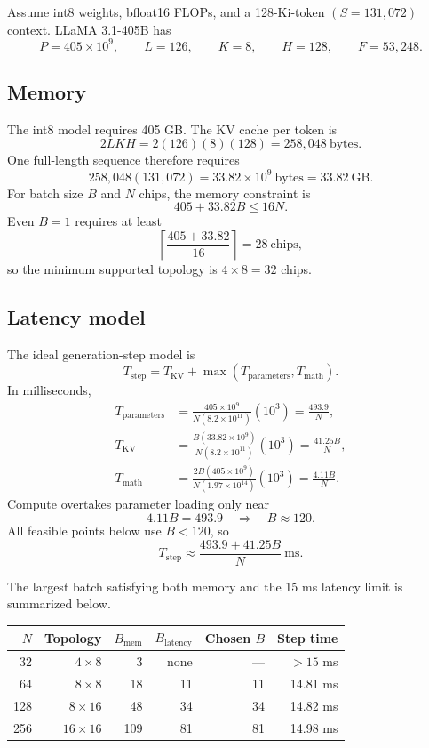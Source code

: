 \documentclass[11pt]{article}
\begin{document}
Assume int8 weights, bfloat16 FLOPs, and a 128-Ki-token
\((S=131{,}072)\) context. LLaMA 3.1-405B has
\[
P=405\times10^9,\qquad L=126,\qquad K=8,\qquad H=128,
\qquad F=53{,}248.
\]

\subsection*{Memory}

The int8 model requires 405 GB. The KV cache per token is
\[
2LKH=2(126)(8)(128)=258{,}048\ \text{bytes}.
\]
One full-length sequence therefore requires
\[
258{,}048(131{,}072)
=33.82\times10^9\ \text{bytes}
=33.82\ \text{GB}.
\]
For batch size \(B\) and \(N\) chips, the memory constraint is
\[
405+33.82B\le16N.
\]
Even \(B=1\) requires at least
\[
\left\lceil\frac{405+33.82}{16}\right\rceil=28\ \text{chips},
\]
so the minimum supported topology is \(4\times8=32\) chips.

\subsection*{Latency model}

The ideal generation-step model is
\[
T_{\mathrm{step}}
=T_{\mathrm{KV}}+
\max\!\left(T_{\mathrm{parameters}},T_{\mathrm{math}}\right).
\]
In milliseconds,
\begin{align*}
T_{\mathrm{parameters}}
&=\frac{405\times10^9}{N(8.2\times10^{11})}(10^3)
=\frac{493.9}{N},\\
T_{\mathrm{KV}}
&=\frac{B(33.82\times10^9)}{N(8.2\times10^{11})}(10^3)
=\frac{41.25B}{N},\\
T_{\mathrm{math}}
&=\frac{2B(405\times10^9)}{N(1.97\times10^{14})}(10^3)
=\frac{4.11B}{N}.
\end{align*}
Compute overtakes parameter loading only near
\[
4.11B=493.9
\quad\Longrightarrow\quad
B\approx120.
\]
All feasible points below use \(B<120\), so
\[
T_{\mathrm{step}}\approx\frac{493.9+41.25B}{N}\ \text{ms}.
\]

The largest batch satisfying both memory and the 15 ms latency limit is
summarized below.

\begin{center}
\begin{tabular}{@{}rrrrrr@{}}
\toprule
\(N\) & Topology & \(B_{\mathrm{mem}}\) & \(B_{\mathrm{latency}}\)
& Chosen \(B\) & Step time \\
\midrule
32  & \(4\times8\)   & 3   & none & --- & \(>15\) ms \\
64  & \(8\times8\)   & 18  & 11   & 11  & 14.81 ms \\
128 & \(8\times16\)  & 48  & 34   & 34  & 14.82 ms \\
256 & \(16\times16\) & 109 & 81   & 81  & 14.98 ms \\
\bottomrule
\end{tabular}
\end{center}
\end{document}
